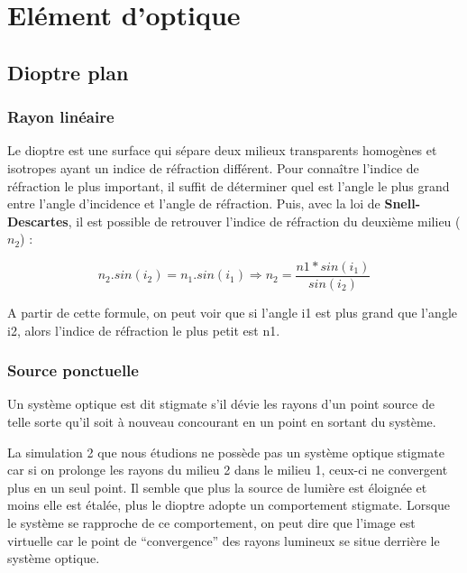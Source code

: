 \section{Elément d'optique}

\subsection{Dioptre plan}

\subsubsection{Rayon linéaire}

Le dioptre est une surface qui sépare deux milieux transparents homogènes et isotropes ayant un indice de réfraction différent.
Pour connaître l'indice de réfraction le plus important, il suffit de déterminer quel est l'angle 
le plus grand entre l'angle d'incidence et l'angle de réfraction. Puis, avec la loi de \textbf{Snell-Descartes}, il est 
possible de retrouver l'indice de réfraction du deuxième milieu ($n_2$) : 

\begin{framed}
$$ n_2.sin(i_2) = n_1.sin(i_1) \Rightarrow n_2 = \frac{n1*sin(i_1)}{sin(i_2)} $$
\end{framed}

A partir de cette formule, on peut voir que si l'angle i1 est plus grand que l'angle i2, alors l'indice de réfraction le plus petit
est n1. \newline



\subsubsection{Source ponctuelle}

Un système optique est dit stigmate s'il dévie les rayons d'un point source de telle sorte qu'il soit à nouveau concourant en 
un point en sortant du système.\newline

La simulation 2 que nous étudions ne possède pas un système optique stigmate car si on prolonge les rayons du milieu 2 dans le milieu
1, ceux-ci ne convergent plus en un seul point. Il semble que plus la source de lumière est éloignée et moins elle est étalée, plus 
le dioptre adopte un comportement stigmate. 
Lorsque le système se rapproche de ce comportement, on peut dire que l'image est virtuelle car 
le point de ``convergence'' des rayons lumineux se situe derrière le système optique.\newline

